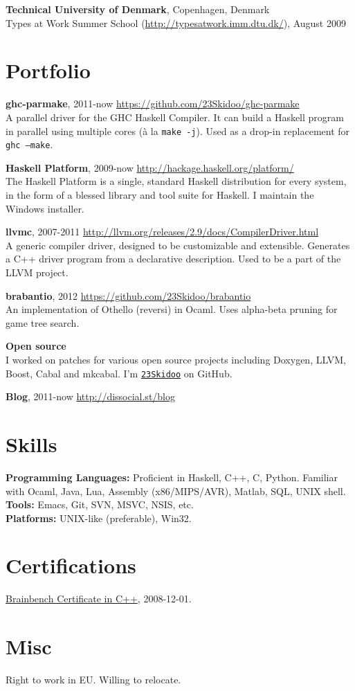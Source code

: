 \documentclass[margin,line]{res}
\begin{document}
\begin{resume}
{\bf Technical University of Denmark}, Copenhagen, Denmark\\
Types at Work Summer School (\url{http://typesatwork.imm.dtu.dk/}), August 2009

\section{\sc Portfolio}

{\bf ghc-parmake}, 2011-now \hfill \url{https://github.com/23Skidoo/ghc-parmake}\\
A parallel driver for the GHC Haskell Compiler. It can build a Haskell
program in parallel using multiple cores (à la \texttt{make -j}). Used as a
drop-in replacement for \texttt{ghc --make}.

{\bf Haskell Platform}, 2009-now \hfill \url{http://hackage.haskell.org/platform/}\\
The Haskell Platform is a single, standard Haskell distribution for every
system, in the form of a blessed library and tool suite for Haskell. I maintain
the Windows installer.

{\bf llvmc}, 2007-2011 \hfill \url{http://llvm.org/releases/2.9/docs/CompilerDriver.html}\\
A generic compiler driver, designed to be customizable and extensible. Generates
a C++ driver program from a declarative description. Used to be a part of the
LLVM project.

{\bf brabantio}, 2012 \hfill \url{https://github.com/23Skidoo/brabantio}\\
An implementation of Othello (reversi) in Ocaml. Uses alpha-beta pruning for
game tree search.

{\bf Open source}\\ I worked on patches for various open source projects
including Doxygen, LLVM, Boost, Cabal and mkcabal. I'm
\href{https://github.com/23Skidoo/}{\texttt{23Skidoo}} on GitHub.

{\bf Blog}, 2011-now \hfill \url{http://dissocial.st/blog}

\section{\sc Skills}

{\bf Programming Languages:} Proficient in Haskell, C++, C, Python. Familiar
with Ocaml, Java, Lua, Assembly (x86/MIPS/AVR), Matlab, SQL, UNIX shell. \\
{\bf Tools:} Emacs, Git, SVN, MSVC, NSIS, etc.\\
{\bf Platforms:} UNIX-like (preferable), Win32.

\section{\sc Certifications}

\href{http://www.brainbench.com/transcript.jsp?pid=5078355}
{Brainbench Certificate in C++}, 2008-12-01.

\section{\sc Misc}

Right to work in EU. Willing to relocate.

\end{resume}
\end{document}
